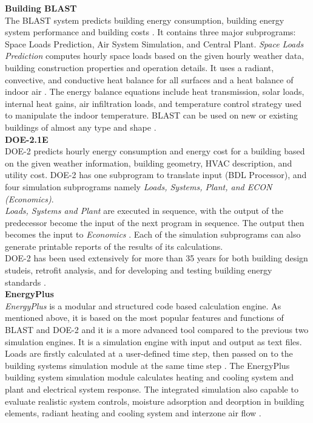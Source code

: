 \documentclass[a4paper, oneside]{discothesis}
\begin{document}
		\textbf{Building BLAST}\\
			The BLAST system predicts building energy consumption, building energy system performance and building costs \cite{crawley2008contrasting}. It contains three major subprograms: Space Loads Prediction, Air System Simulation, and Central Plant. \textit{Space Loads Prediction} computes hourly space loads based on the given hourly weather data, building construction properties and operation details. It uses a radiant, convective, and conductive heat balance for all surfaces and a heat balance of indoor air \cite{crawley2008contrasting}. The energy balance equations include heat transmission, solar loads, internal heat gains, air infiltration loads, and temperature control strategy used to manipulate the indoor temperature. BLAST can be used on new or existing buildings of almost any type and shape \cite{crawley2008contrasting}.\\

		\textbf{DOE-2.1E}\\
			DOE-2 predicts hourly energy consumption and energy cost for a building based on the given weather information, building geometry, HVAC description, and utility cost. DOE-2 has one subprogram to translate input (BDL Processor), and four simulation subprograms namely \textit{Loads, Systems, Plant, and ECON (Economics)}.\\
			\textit{Loads, Systems and Plant} are executed in sequence, with the output of the predecessor become the input of the next program in sequence. The output then becomes the input to \textit{Economics} \cite{crawley2008contrasting}. Each of the simulation subprograms can also generate printable reports of the results of its calculations.\\
			DOE-2 has been used extensively for more than 35 years for both building design studeis, retrofit analysis, and for developing and testing building energy standards \cite{crawley2008contrasting}.\\
		

		\textbf{EnergyPlus}\\
			\textit{EnergyPlus} is a modular and structured code based calculation engine. As mentioned above, it is based on the most popular features and functions of BLAST and DOE-2 and it is a more advanced tool compared to the previous two simulation engines. It is a simulation engine with input and output as text files. Loads are firstly calculated at a user-defined time step, then passed on to the building systems simulation module at the same time step \cite{crawley2008contrasting}. The EnergyPlus building system simulation module calculates heating and cooling system and plant and electrical system response. The integrated simulation also capable to evaluate realistic system controls, moisture adsorption and deorption in building elements, radiant heating and cooling system and interzone air flow \cite{crawley2008contrasting}.\\
\end{document}
